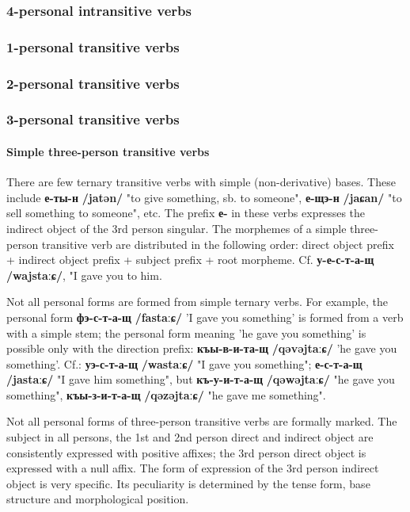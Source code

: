 \documentclass[a4paper,12pt]{book}
\newcommand{\1}[1]{\textbf{\emph{#1}}} %
\newcommand{\2}[1]{\textbf{[#1]}} %
\newcommand{\3}[1]{\fontsize{11pt}{0cm}\textbf{\emph{#1}}} %
\newcommand{\4}[1]{\fontsize{10pt}{0cm}\emph{#1}}	%
\newcommand{\5}[1]{\textbf{/#1/}} %
\newcommand{\6}[1]{\textbf{[#1]}} %
\newcommand{\7}[1]{\fontsize{12pt}{0cm}\emph{#1}} %
\newcommand{\8}[1]{\fontsize{12pt}{0cm}`#1'} %
\newcommand{\9}[1]{\fontsize{12pt}{0cm}(lit. `#1')} %
\newcommand{\glossphonemics}[1]{\textbf{/#1/}} %
\begin{document}
\subsubsection{4-personal intransitive verbs}
\subsubsection{1-personal transitive verbs}
\subsubsection{2-personal transitive verbs}
\subsubsection{3-personal transitive verbs}
\paragraph{Simple three-person transitive verbs}
There are few ternary transitive verbs with simple (non-derivative) bases. These include \textbf{е-ты-н} \glossphonemics{jatən} "to give something, sb. to someone", \textbf{е-щэ-н} \glossphonemics{jaɕan} "to sell something to someone", etc. The prefix \textbf{е-} in these verbs expresses the indirect object of the 3rd person singular. The morphemes of a simple three-person transitive verb are distributed in the following order: direct object prefix + indirect object prefix + subject prefix + root morpheme. Cf. \textbf{у-е-с-т-а-щ} \glossphonemics{wajstaːɕ}, "I gave you to him.

Not all personal forms are formed from simple ternary verbs. For example, the personal form \textbf{фэ-с-т-а-щ} \glossphonemics{fastaːɕ} 'I gave you something' is formed from a verb with a simple stem; the personal form meaning 'he gave you something' is possible only with the direction prefix: \textbf{къы-в-и-та-щ} \glossphonemics{qəvəjtaːɕ} 'he gave you something'. Cf.: \textbf{уэ-с-т-а-щ} \glossphonemics{wastaːɕ} "I gave you something"; \textbf{е-с-т-а-щ} \glossphonemics{jastaːɕ} "I gave him something", but \textbf{къ-у-и-т-а-щ} \glossphonemics{qəwəjtaːɕ} "he gave you something", \textbf{къы-з-и-т-а-щ} \glossphonemics{qəzəjtaːɕ} "he gave me something".

Not all personal forms of three-person transitive verbs are formally marked. The subject in all persons, the 1st and 2nd person direct and indirect object are consistently expressed with positive affixes; the 3rd person direct object is expressed with a null affix. The form of expression of the 3rd person indirect object is very specific. Its peculiarity is determined by the tense form, base structure and morphological position.
\end{document}
